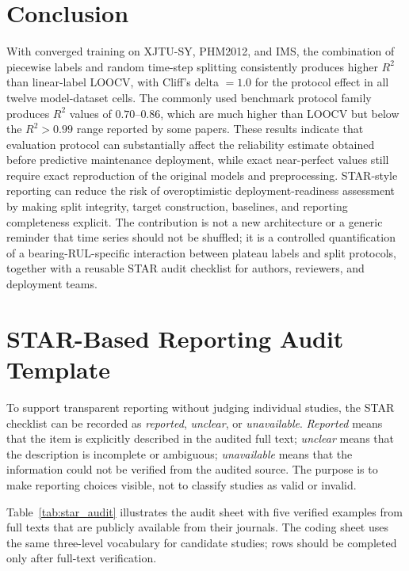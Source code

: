 \documentclass[pdflatex,sn-mathphys-num]{sn-jnl}
\begin{document}
\section{Conclusion}
With converged training on XJTU-SY, PHM2012, and IMS, the combination of piecewise labels and random time-step splitting consistently produces higher $R^2$ than linear-label LOOCV, with Cliff's delta $=1.0$ for the protocol effect in all twelve model-dataset cells. The commonly used benchmark protocol family produces $R^2$ values of $0.70$--$0.86$, which are much higher than LOOCV but below the $R^2>0.99$ range reported by some papers. These results indicate that evaluation protocol can substantially affect the reliability estimate obtained before predictive maintenance deployment, while exact near-perfect values still require exact reproduction of the original models and preprocessing. STAR-style reporting can reduce the risk of overoptimistic deployment-readiness assessment by making split integrity, target construction, baselines, and reporting completeness explicit. The contribution is not a new architecture or a generic reminder that time series should not be shuffled; it is a controlled quantification of a bearing-RUL-specific interaction between plateau labels and split protocols, together with a reusable STAR audit checklist for authors, reviewers, and deployment teams.

\appendix
\section{STAR-Based Reporting Audit Template}
To support transparent reporting without judging individual studies, the STAR checklist can be recorded as \emph{reported}, \emph{unclear}, or \emph{unavailable}. \emph{Reported} means that the item is explicitly described in the audited full text; \emph{unclear} means that the description is incomplete or ambiguous; \emph{unavailable} means that the information could not be verified from the audited source. The purpose is to make reporting choices visible, not to classify studies as valid or invalid.

Table~\ref{tab:star_audit} illustrates the audit sheet with five verified examples from full texts that are publicly available from their journals. The coding sheet uses the same three-level vocabulary for candidate studies; rows should be completed only after full-text verification.
\end{document}
